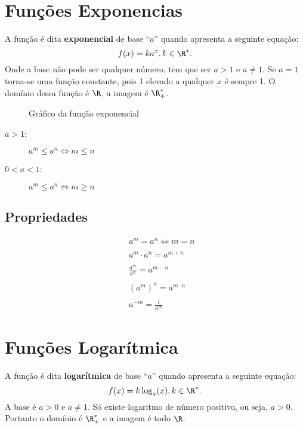 
\section{Funções Exponencias}

	A função é dita \textbf{exponencial} de base ``$a$'' quando apresenta a seguinte equação:
	\[
		f(x) = ka^{x}, k \in \R^{*}
	.\] 
	Onde a base não pode ser qualquer número, tem que ser $a > 1$ e $a \neq 1$. Se $a = 1$ torna-se uma função constante, pois 1 elevado a qualquer $x$ é sempre 1. O domínio dessa função é $\R$, a imagem é $\R^{*}_{+}$.
\begin{figure}[ht]
    \centering
   \caption{Gráfico da função exponencial}
   \label{fig:graf-exp}
\end{figure}

\begin{description}
	\item [$a > 1$:]  $a^{m} \leq a^{n} \iff m \leq n$
	\item [$0 < a < 1$:] $a^{m} \leq a^{n} \iff m \geq n$
\end{description}

\subsection{Propriedades}
\begin{eqnarray*}
	&&a^{m} = a^{n} \iff m = n \\
	\\
	&&a^{m}\cdot a^{n} = a^{m+n} \\
	\\
	&&\frac{a^{m}}{a^{n}} = a^{m-n} \\
	\\
	&&(a^{m})^{n} = a^{m\cdot n} \\
	\\
	&&a^{-m} = \frac{1}{a^{m}}
\end{eqnarray*}

\section{Funções Logarítmica}

A função é dita \textbf{logarítmica} de base ``$a$'' quando apresenta a seguinte equação:
\[
	f(x) = k \log_{a}(x), k \in \R^{*}
.\]
A base é $a > 0$ e $a \neq 1$. Só existe logaritmo de número positivo, ou seja, $a > 0$. Portanto o domínio é  $\R^{*}_{+}$ e a imagem é todo $\R$.

